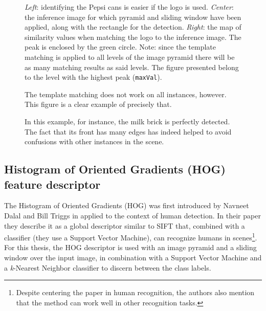 \documentclass[../main.tex]{subfiles}
\begin{document}
\begin{figure}[htbp]
    \centering
    \caption{\emph{Left}: identifying the Pepsi cans is easier if the logo is used. \emph{Center}: the inference image for which pyramid and sliding window have been applied, along with the rectangle for the detection. \emph{Right}: the map of similarity values when matching the logo to the inference image. The peak is enclosed by the green circle. Note: since the template matching is applied to all levels of the image pyramid there will be as many matching results as said levels. The figure presented belong to the level with the highest peak (\texttt{maxVal}).}
    \label{fig:2pepsi_TM}
\end{figure}

\begin{figure}[htbp]
    \centering
    \caption{The template matching does not work on all instances, however. This figure is a clear example of precisely that.}
    \label{fig:0pepsi_testbench_TM}
\end{figure}

\begin{figure}[htbp]
    \centering
    \caption{In this example, for instance, the milk brick is perfectly detected. The fact that its front has many edges has indeed helped to avoid confusions with other instances in the scene.}
    \label{fig:5milk_testbench2_TM}
\end{figure}

\subsection{Histogram of Oriented Gradients (HOG) feature descriptor}
The Histogram of Oriented Gradients (HOG) was first introduced by Navneet Dalal and Bill Triggs in \cite{hog_paper} applied to the context of human detection. In their paper they describe it as a global descriptor similar to SIFT \cite{SIFTlowe2004} that, combined with a classifier (they use a Support Vector Machine), can recognize humans in scenes\footnote{Despite centering the paper in human recognition, the authors also mention that the method can work well in other recognition tasks.}. For this thesis, the HOG descriptor is used with an image pyramid and a sliding window over the input image, in combination with a Support Vector Machine and a \emph{k}-Nearest Neighbor classifier to discern between the class labels.
\end{document}
